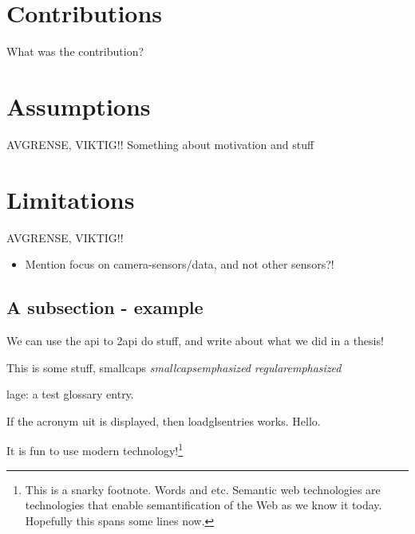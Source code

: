 \documentclass[USenglish]{uit-thesis}
\begin{document}
\section{Contributions}
What was the contribution?

\section{Assumptions}
AVGRENSE, VIKTIG!!
Something about motivation and stuff

\section{Limitations}
AVGRENSE, VIKTIG!!

\begin{itemize}
\item Mention focus on camera-sensors/data, and not other sensors?!
\end{itemize}





\iffalse
\subsection{A subsection - example}
We can use the \ac{api} to \ac{2api} do stuff, and write about what we did in a \gls{thesis}!

This is some stuff, {\sc smallcaps {\em smallcapsemphasized}} {\em regularemphasized}

\Gls{lage}: a test glossary entry.

If the acronym \ac{uit} is displayed, then loadglsentries works.
Hello.

It is fun to use modern  technology!\footnote{This is a snarky footnote. Words and etc. Semantic web technologies are technologies that enable semantification of the Web as we know it today. Hopefully this spans some lines now.}
\end{document}
